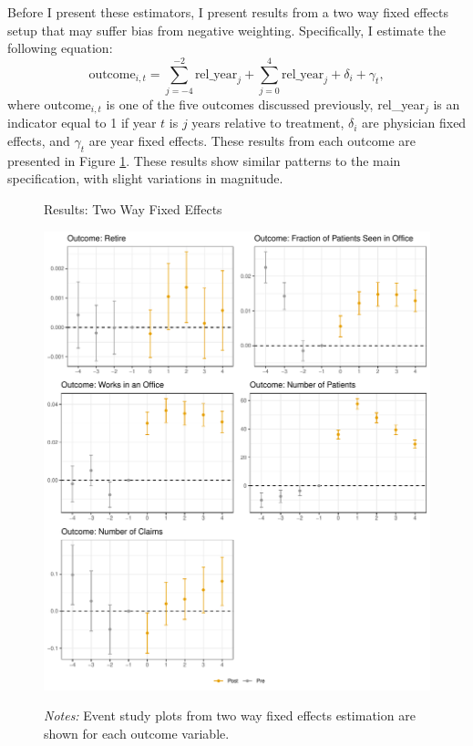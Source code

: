 \documentclass[12pt]{article}
\begin{document}
Before I present these estimators, I present results from a two way fixed effects setup that may suffer bias from negative weighting. Specifically, I estimate the following equation:
$$\text{outcome}_{i,t}=\sum_{j=-4}^{-2} \text{rel\_year}_{j} + \sum_{j=0}^{4} \text{rel\_year}_{j} + \delta_i + \gamma_t,$$
where outcome$_{i,t}$ is one of the five outcomes discussed previously, rel\_year$_j$ is an indicator equal to 1 if year $t$ is $j$ years relative to treatment, $\delta_i$ are physician fixed effects, and $\gamma_t$ are year fixed effects.
These results from each outcome are presented in Figure \ref{fig:twfe}. These results show similar patterns to the main specification, with slight variations in magnitude. 

\begin{figure}
    \centering
    \captionsetup{width=.8\linewidth}
    \caption{Results: Two Way Fixed Effects}
    \includegraphics[scale=.6]{Objects/twfe_plot.pdf}
    \label{fig:twfe}
    \vspace{2mm}
    \caption*{\footnotesize{\textit{Notes:} Event study plots from two way fixed effects estimation are shown for each outcome variable.}}
\end{figure}
\end{document}
